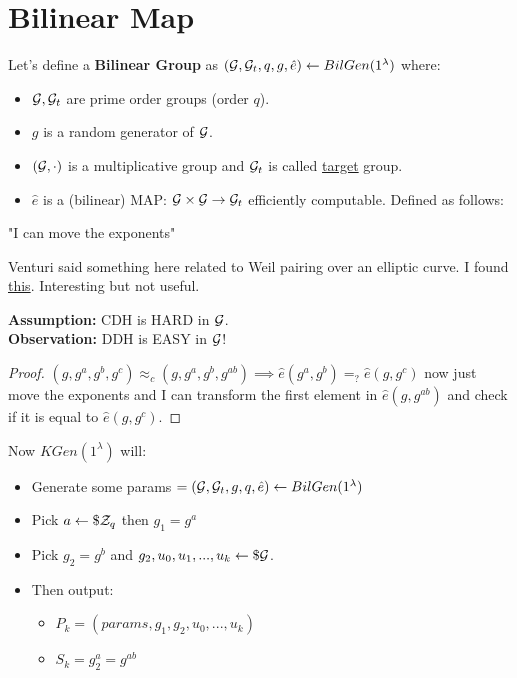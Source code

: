 \section{Bilinear Map}
Let's define a \textbf{Bilinear Group} as $(\mathcal{G}, \mathcal{G}_t, q, g, \hat{e})\leftarrow BilGen(1^{\lambda})$ where:
\begin{itemize}
    \item $\mathcal{G}, \mathcal{G}_t$ are prime order groups (order $q$).
    \item $g$ is a random generator of $\mathcal{G}$.
    \item $(\mathcal{G}, \cdot)$ is a multiplicative group and $\mathcal{G}_t$ is called \underline{target} group.
    \item $\hat{e}$ is a (bilinear) MAP: $\mathcal{G} \times \mathcal{G} \rightarrow \mathcal{G}_t$ efficiently computable. Defined as follows:
    
\end{itemize}
"I can move the exponents"

Venturi said something here related to Weil pairing over an elliptic curve. I found \href{https://www.math.auckland.ac.nz/~sgal018/crypto-book/ch26.pdf}{this}. Interesting but not useful.
 
\noindent\textbf{Assumption:} CDH is HARD in $\mathcal{G}$.\\
\textbf{Observation:} DDH is EASY in $\mathcal{G}$!
\begin{proof}
    $(g,g^a,g^b,g^c)\approx_c (g,g^a,g^b,g^{ab}) \implies \hat{e}(g^a,g^b)=_?\hat{e}(g,g^c)$ now just move the exponents and I can transform the first element in $\hat{e}(g,g^{ab})$ and check if it is equal to $\hat{e}(g,g^c)$.
\end{proof}

Now $KGen(1^{\lambda})$ will:
\begin{itemize}
    \item Generate some params $ =(\mathcal{G},\mathcal{G}_t,g,q,\hat{e})\leftarrow BilGen(1^{\lambda})$ 
    \item Pick $a \leftarrow\$ \mathcal{Z}_q$ then $g_1=g^a$
    \item Pick $g_2=g^b$ and $g_2,u_0,u_1,...,u_k \leftarrow\$ \mathcal{G}$.
    \item Then output: 
    \begin{itemize}
        \item $P_k=(params, g_1,g_2,u_0,...,u_k)$
        \item $S_k=g_2^a=g^{ab}$
    \end{itemize}
\end{itemize}

